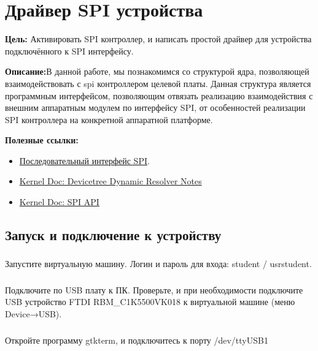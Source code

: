 \chapter{Драйвер SPI устройства}
\textbf{Цель:} Активировать SPI контроллер, и написать простой драйвер для устройства подключённого к SPI интерфейсу.

\vspace{5mm}
\textbf{Описание:}В данной работе, мы познакомимся со структурой ядра, позволяющей взаимодействовать с spi контроллером целевой платы. Данная структура является программным интерфейсом, позволяющим отвязать реализацию взаимодействия с внешним аппаратным модулем по интерфейсу SPI, от особенностей реализации SPI контроллера на конкретной аппаратной платформе. 

\vspace{5mm}
\textbf{Полезные ссылки:}
\begin{itemize}
	\item \href{http://www.gaw.ru/html.cgi/txt/interface/spi/index.htm}{Последовательный интерфейс SPI}.
	\item \href{https://docs.kernel.org/devicetree/dynamic-resolution-notes.html}{Kernel Doc: Devicetree Dynamic Resolver Notes}
	\item \href{https://www.kernel.org/doc/html/v4.15/driver-api/spi.html}{Kernel Doc: SPI API}	
\end{itemize}

\section{Запуск и подключение к устройству}

\subsection{}Запустите виртуальную машину. Логин и пароль для входа: student / usrstudent.

\subsection{}Подключите по USB плату к ПК. Проверьте, и при необходимости подключите USB устройство FTDI RBM\_C1K5500VK018 к виртуальной машине (меню Device→USB).

\subsection{}Откройте программу gtkterm, и подключитесь к порту /dev/ttyUSB1

